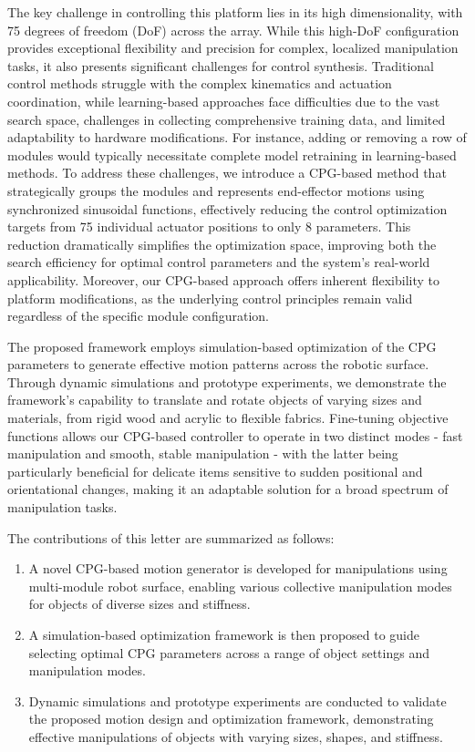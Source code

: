 The key challenge in controlling this platform lies in its high dimensionality, with 75 degrees of freedom (DoF) across the array. While this high-DoF configuration provides exceptional flexibility and precision for complex, localized manipulation tasks, it also presents significant challenges for control synthesis. Traditional control methods struggle with the complex kinematics and actuation coordination, while learning-based approaches face difficulties due to the vast search space, challenges in collecting comprehensive training data, and limited adaptability to hardware modifications. For instance, adding or removing a row of modules would typically necessitate complete model retraining in learning-based methods. To address these challenges, we introduce a CPG-based method that strategically groups the modules and represents end-effector motions using synchronized sinusoidal functions, effectively reducing the control optimization targets from 75 individual actuator positions to only 8 parameters. This reduction dramatically simplifies the optimization space, improving both the search efficiency for optimal control parameters and the system's real-world applicability. Moreover, our CPG-based approach offers inherent flexibility to platform modifications, as the underlying control principles remain valid regardless of the specific module configuration.

The proposed framework employs simulation-based optimization of the CPG parameters to generate effective motion patterns across the robotic surface. Through dynamic simulations and prototype experiments, we demonstrate the framework's capability to translate and rotate objects of varying sizes and materials, from rigid wood and acrylic to flexible fabrics. Fine-tuning objective functions allows our CPG-based controller to operate in two distinct modes - fast manipulation and smooth, stable manipulation - with the latter being particularly beneficial for delicate items sensitive to sudden positional and orientational changes, making it an adaptable solution for a broad spectrum of manipulation tasks.


The contributions of this letter are summarized as follows:
\begin{enumerate}
    \item  A novel CPG-based motion generator is developed for manipulations using multi-module robot surface, enabling various collective manipulation modes for objects of diverse sizes and stiffness.
    \item  A simulation-based optimization framework is then proposed to guide selecting optimal CPG parameters across a range of object settings and manipulation modes.
    \item  Dynamic simulations and prototype experiments are conducted to validate the proposed motion design and optimization framework, demonstrating effective manipulations of objects with varying sizes, shapes, and stiffness.
\end{enumerate}



